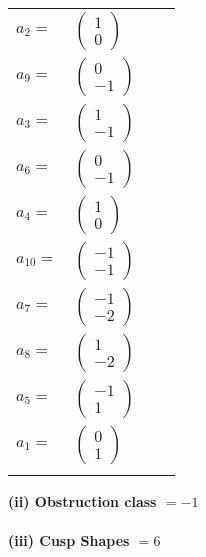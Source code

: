 \documentclass[1p]{elsarticle_modified}
\theoremstyle{definition}
\begin{document}
\begin{tabular}{m{7pt} m{180pt} m{7pt} m{180pt} }
\flushright $a_{2}=$&$\begin{pmatrix}1\\0\end{pmatrix}$ \\
\flushright $a_{9}=$&$\begin{pmatrix}0\\-1\end{pmatrix}$ \\
\flushright $a_{3}=$&$\begin{pmatrix}1\\-1\end{pmatrix}$ \\
\flushright $a_{6}=$&$\begin{pmatrix}0\\-1\end{pmatrix}$ \\
\flushright $a_{4}=$&$\begin{pmatrix}1\\0\end{pmatrix}$ \\
\flushright $a_{10}=$&$\begin{pmatrix}-1\\-1\end{pmatrix}$ \\
\flushright $a_{7}=$&$\begin{pmatrix}-1\\-2\end{pmatrix}$ \\
\flushright $a_{8}=$&$\begin{pmatrix}1\\-2\end{pmatrix}$ \\
\flushright $a_{5}=$&$\begin{pmatrix}-1\\1\end{pmatrix}$ \\
\flushright $a_{1}=$&$\begin{pmatrix}0\\1\end{pmatrix}$\\&\end{tabular}
\flushleft \textbf{(ii) Obstruction class $= -1$}\\~\\
\flushleft \textbf{(iii) Cusp Shapes $= 6$}\\~\\
\end{document}
